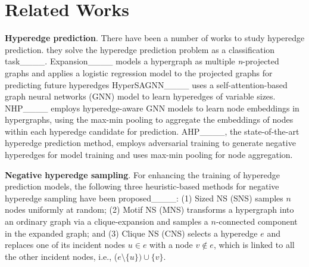 \section{Related Works}
\label{sec-related}
\textbf{Hyperedge prediction}.
There have been a number of works to study hyperedge prediction.
they solve the hyperedge prediction problem as a classification task____.
Expansion____ models a hypergraph as multiple \textit{n}-projected graphs and applies a logistic regression model to the projected graphs for predicting future hyperedges 
HyperSAGNN____ uses a self-attention-based graph neural networks (GNN) model to learn hyperedges of variable sizes. 
NHP____ employs hyperedge-aware GNN models to learn node embeddings in hypergraphs, using the max-min pooling to aggregate the embeddings of nodes within each hyperedge candidate for prediction. 
AHP____, the state-of-the-art hyperedge prediction method, employs adversarial training to generate negative hyperedges for model training and uses max-min pooling for node aggregation. 


\vspace{1mm}
\noindent
\textbf{Negative hyperedge sampling}.
For enhancing the training of hyperedge prediction models, 
the following three heuristic-based methods for negative hyperedge sampling have been proposed____:
(1) Sized NS (SNS) samples $n$ nodes uniformly at random;
(2) Motif NS (MNS) transforms a hypergraph into an ordinary graph via a clique-expansion and samples a $n$-connected component in the expanded graph;
and (3) Clique NS (CNS) selects a hyperedge $e$ and replaces one of its incident nodes $u\in e$ with a node $v\notin e$, which is linked to all the other incident nodes, i.e., ($e \setminus \{u\}) \cup \{v\}$.






